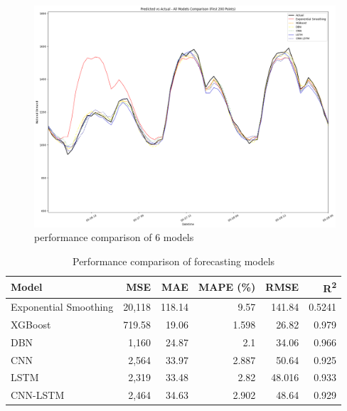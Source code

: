  \begin{figure}[h]
 	\centering
 	\includegraphics[width=0.8\linewidth]{Chapters/images/results/all_model_comparison}
 	\caption{performance comparison of 6 models}
 	\label{fig:allmodelcomparison}
 \end{figure}
 
 \begin{table}[htbp]
 	\centering
 	\caption{Performance comparison of forecasting models}
 	\label{tab:model-performance}
 	\begin{tabular}{lrrrrr}
 		\hline
 		\textbf{Model} & \textbf{MSE} & \textbf{MAE} & \textbf{MAPE (\%)} & \textbf{RMSE} & \textbf{R\textsuperscript{2}} \\
 		\hline
 		Exponential Smoothing & 20,118 & 118.14 & 9.57 & 141.84 & 0.5241 \\
 		XGBoost               & 719.58 & 19.06  & 1.598 & 26.82  & 0.979  \\
 		DBN                   & 1,160  & 24.87  & 2.1   & 34.06  & 0.966  \\
 		CNN                   & 2,564  & 33.97  & 2.887 & 50.64  & 0.925  \\
 		LSTM                  & 2,319  & 33.48  & 2.82  & 48.016 & 0.933  \\
 		CNN-LSTM              & 2,464  & 34.63  & 2.902 & 48.64  & 0.929  \\
 		\hline
 	\end{tabular}
 \end{table}
 
